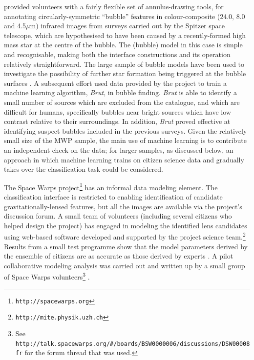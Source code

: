\documentclass{ar2e}
\begin{document}
\citet{SimpsonEtal2012} provided volunteers with a fairly flexible set of
annulus-drawing tools, for annotating circularly-symmetric ``bubble'' features
in colour-composite (24.0, 8.0 and  4.5$\mu$m) infrared images from surveys
carried out by the Spitzer space telescope, which are hypothesised to have been
caused by a recently-formed high mass star at the centre of the bubble. The
(bubble) model in this case is simple and recognisable, making both the
interface constructions and its operation relatively straightforward. The large
sample of  bubble models have been used to investigate the possibility of
further star formation being triggered at the bubble surfaces
\citep{KendrewEtal2012}. A subsequent effort \citep{Beaumont} used data provided
by the project to train a machine learning algorithm, \emph{Brut}, in bubble
finding. \emph{Brut} is able to identify a small number of sources which are
excluded from the \citeauthor{SimpsonEtal2012} catalogue, and which are
difficult for humans, specifically bubbles near bright sources which have low
contrast relative to their surroundings. In addition, \emph{Brut} proved
effective at identifying suspect bubbles included in the previous surveys. Given
the relatively small size of the MWP sample, the main use of machine learning is
to contribute an independent check on the data; for larger samples, as discussed
below, an approach in which machine learning trains on citizen science data and
gradually takes over the classification task could be considered. 

 The Space Warps
project\footnote{\texttt{http://spacewarps.org}} has an informal data modeling
element. The classification interface is restricted to enabling identification
of candidate gravitationally-lensed features, but all the images are available
via the project's discussion forum. A small team of volunteers (including
several citizens who helped design the project) has engaged in modeling the 
identified lens candidates using web-based software developed and supported by
the project science
team.\footnote{\texttt{http://mite.physik.uzh.ch}} Results from a
small test programme show that the model parameters derived by the  ensemble
of citizens are as accurate as those derived by experts \citep{KuengEtal2014}.
A pilot collaborative modeling analysis was carried out and written up by a
small group of Space Warps volunteers\footnote{See
\texttt{http://talk.spacewarps.org/\#/boards/BSW0000006/discussions/DSW00008fr}
for the forum thread that was used.} \citep{Wilcox2014}.
\end{document}
